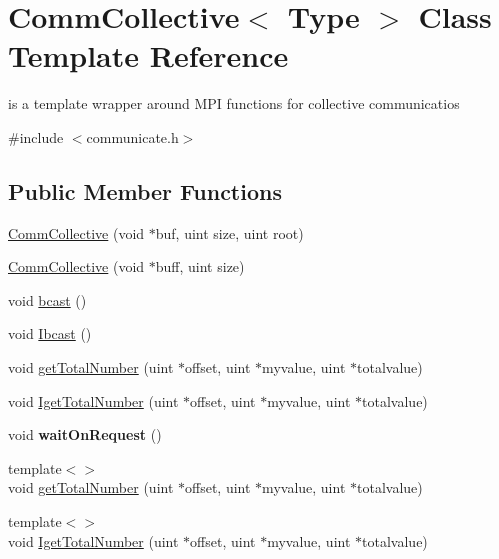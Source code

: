 \hypertarget{classCommCollective}{}\section{Comm\+Collective$<$ Type $>$ Class Template Reference}
\label{classCommCollective}


is a template wrapper around M\+PI functions for collective communicatios  




{\ttfamily \#include $<$communicate.\+h$>$}

\subsection*{Public Member Functions}
\begin{DoxyCompactItemize}
\item 
\mbox{\hyperlink{classCommCollective_ad583efe49e3dd7883f76dcb82b34cebb}{Comm\+Collective}} (void $\ast$buf, uint size, uint root)
\item 
\mbox{\hyperlink{classCommCollective_a9315504a2e5e83cb04f3b8e80b7ff3d5}{Comm\+Collective}} (void $\ast$buff, uint size)
\item 
void \mbox{\hyperlink{classCommCollective_a438805e16ba8c74b0682a0bf27b4b0f3}{bcast}} ()
\item 
void \mbox{\hyperlink{classCommCollective_af79e85456fe4bf007ccb6ad0c7e41151}{Ibcast}} ()
\item 
void \mbox{\hyperlink{classCommCollective_a2a300899ded8e81afa840f06497716f9}{get\+Total\+Number}} (uint $\ast$offset, uint $\ast$myvalue, uint $\ast$totalvalue)
\item 
void \mbox{\hyperlink{classCommCollective_a0b8611d0fce41f5b6629ebf702e7aa4b}{Iget\+Total\+Number}} (uint $\ast$offset, uint $\ast$myvalue, uint $\ast$totalvalue)
\item 
\mbox{\label{classCommCollective_af9b5d68df879f888a107009d783e20f6}} 
void {\bfseries wait\+On\+Request} ()
\item 
{\footnotesize template$<$$>$ }\\void \mbox{\hyperlink{classCommCollective_a493fba4b35a6f42599753b48c431684a}{get\+Total\+Number}} (uint $\ast$offset, uint $\ast$myvalue, uint $\ast$totalvalue)
\item 
{\footnotesize template$<$$>$ }\\void \mbox{\hyperlink{classCommCollective_a2603f0331222a5f76a29a0bf3a187ae4}{Iget\+Total\+Number}} (uint $\ast$offset, uint $\ast$myvalue, uint $\ast$totalvalue)
\end{DoxyCompactItemize}



